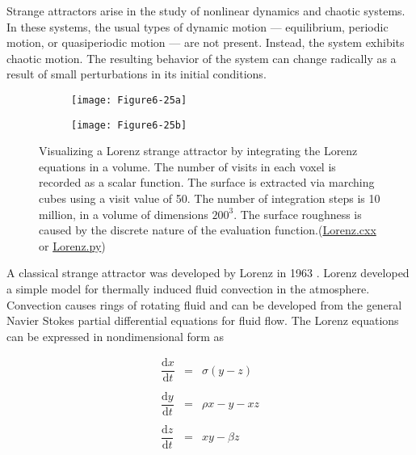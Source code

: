 \begin{description}[leftmargin=0cm,labelindent=0cm]
Strange attractors arise in the study of nonlinear dynamics and chaotic systems. In these systems, the usual types of dynamic motion --- equilibrium, periodic motion, or quasiperiodic motion --- are not present. Instead, the system exhibits chaotic motion. The resulting behavior of the system can change radically as a result of small perturbations in its initial conditions.

\begin{figure}[htb]
	\begin{subfigure}[h]{0.48\linewidth}
		\texttt{[image: Figure6-25a]}
		\caption{}
		\label{fig:Figure6-25a}
	\end{subfigure}
	\hfill
	\begin{subfigure}[h]{0.48\linewidth}
		\texttt{[image: Figure6-25b]}
		\caption{}
		\label{fig:Figure6-25b}
	\end{subfigure}
	\caption{Visualizing a Lorenz strange attractor by integrating the Lorenz equations in a volume. The number of visits in each voxel is recorded as a scalar function. The surface is extracted via marching cubes using a visit value of 50. The number of integration steps is 10 million, in a volume of dimensions $200^3$. The surface roughness is caused by the discrete nature of the evaluation function.(\href{https://lorensen.github.io/VTKExamples/site/Cxx/Visualization/Lorenz}{Lorenz.cxx} or \href{https://lorensen.github.io/VTKExamples/site/Python/Visualization/Lorenz/}{Lorenz.py})}\label{fig:Figure6-25}
\end{figure}

A classical strange attractor was developed by Lorenz in 1963 \cite{Lorenz63}. Lorenz developed a simple model for thermally induced fluid convection in the atmosphere. Convection causes rings of rotating fluid and can be developed from the general Navier Stokes partial differential equations for fluid flow. The Lorenz equations can be expressed in nondimensional form as

\begin{equation}\label{eq:6.16}
\begin{array}{lll}
\dfrac{\text{d}x}{\text{d}t} &=& \sigma (y - z) \\ \\
\dfrac{\text{d}y}{\text{d}t} &=& \rho x - y - x z \\ \\
\dfrac{\text{d}z}{\text{d}t} &=& x y - \beta z
\end{array}
\end{equation}


\end{description}
